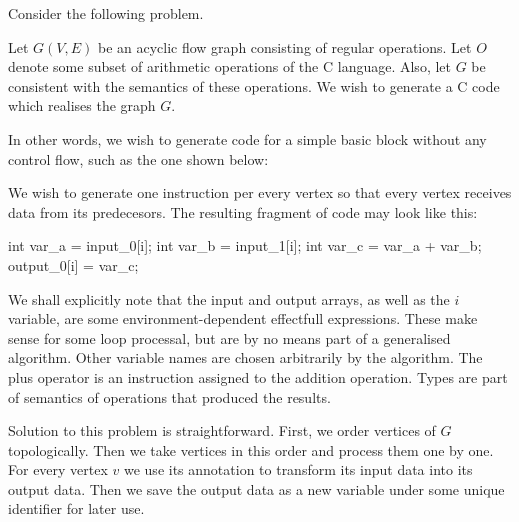 \label{sec:simplegensec}

Consider the following problem.

Let $G(V,E)$ be an acyclic flow graph consisting of regular operations. Let $O$ denote some subset of arithmetic operations of the C language. Also, let $G$ be consistent with the semantics of these operations. We wish to generate a C code which realises the graph $G$.
\myendprob

In other words, we wish to generate code for a simple basic block without any control flow, such as the one shown below:


We wish to generate one instruction per every vertex so that every vertex receives data from its predecesors. The resulting fragment of code may look like this:

\mybeginfig
\begin{code}
int var_a = input_0[i];
int var_b = input_1[i];
int var_c = var_a + var_b;
output_0[i] = var_c;
\end{code}

\begin{rem}
  We shall explicitly note that the input and output arrays, as well as the $i$ variable, are some environment-dependent effectfull expressions. These make sense for some loop processal, but are by no means part of a generalised algorithm. Other variable names are chosen arbitrarily by the algorithm. The plus operator is an instruction assigned to the addition operation. Types are part of semantics of operations that produced the results.
\end{rem}

Solution to this problem is straightforward. First, we order vertices of $G$ topologically. Then we take vertices in this order and process them one by one. For every vertex $v$ we use its annotation to transform its input data into its output data. Then we save the output data as a new variable under some unique identifier for later use. 

